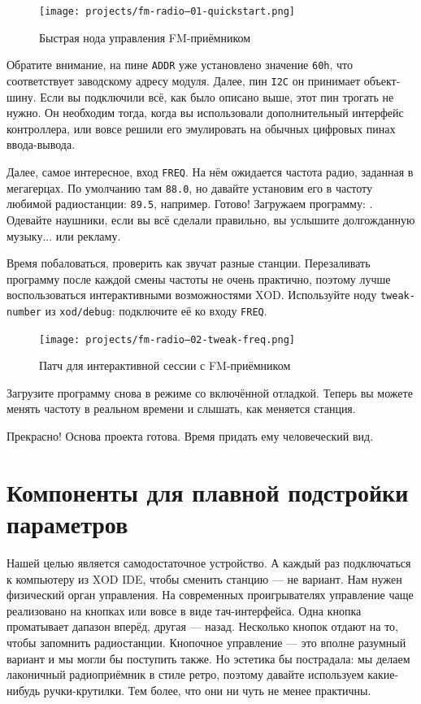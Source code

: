 \begin{figure}
  \centering
  \texttt{[image: projects/fm-radio--01-quickstart.png]}
  \caption{Быстрая нода управления FM-приёмником}
\end{figure}

Обратите внимание, на пине \texttt{ADDR} уже установлено значение \texttt{60h}, что соответствует заводскому адресу модуля. Далее, пин \texttt{I2C} он принимает объект-шину. Если вы подключили всё, как было описано выше, этот пин трогать не нужно. Он необходим тогда, когда вы использовали дополнительный интерфейс контроллера, или вовсе решили его эмулировать на обычных цифровых пинах ввода-вывода.

Далее, самое интересное, вход \texttt{FREQ}. На нём ожидается частота радио, заданная в мегагерцах. По умолчанию там \texttt{88.0}, но давайте установим его в частоту любимой радиостанции: \texttt{89.5}, например.  Готово! Загружаем программу: . Одевайте наушники, если вы всё сделали правильно, вы услышите долгожданную музыку... или рекламу.

Время побаловаться, проверить как звучат разные станции. Перезаливать программу после каждой смены частоты не очень практично, поэтому лучше воспользоваться интерактивными возможностями XOD. Используйте ноду \texttt{tweak-number} из \texttt{xod/debug}: подключите её ко входу \texttt{FREQ}.

\begin{figure}
  \centering
  \texttt{[image: projects/fm-radio--02-tweak-freq.png]}
  \caption{Патч для интерактивной сессии с FM-приёмником}
\end{figure}

Загрузите программу снова в режиме со включённой отладкой. Теперь вы можете менять частоту в реальном времени и слышать, как меняется станция.

Прекрасно! Основа проекта готова. Время придать ему человеческий вид.

\section{Компоненты для плавной подстройки параметров}

Нашей целью является самодостаточное устройство. А каждый раз подключаться к компьютеру из XOD IDE, чтобы сменить станцию — не вариант. Нам нужен физический орган управления. На современных проигрывателях управление чаще реализовано на кнопках или вовсе в виде тач-интерфейса. Одна кнопка проматывает дапазон вперёд, другая — назад. Несколько кнопок отдают на то, чтобы запомнить радиостанции. Кнопочное управление — это вполне разумный вариант и мы могли бы поступить также. Но эстетика бы пострадала: мы делаем лаконичный радиоприёмник в стиле ретро, поэтому давайте используем какие-нибудь ручки-крутилки. Тем более, что они ни чуть не менее практичны.

